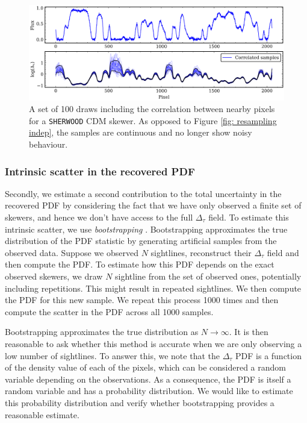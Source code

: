 \begin{figure}
    \centering
    \includegraphics[width=0.85\linewidth]{img/ML/ml_resample_corr.png}
    \caption{A set of 100 draws including the correlation between nearby pixels for a \texttt{SHERWOOD} CDM skewer. As opposed to Figure \ref{fig: resampling indep}, the samples are continuous and no longer show noisy behaviour.}
    \label{fig: resampling corr}
\end{figure}

\subsubsection{Intrinsic scatter in the recovered PDF}
Secondly, we estimate a second contribution to the total uncertainty in the recovered PDF by considering the fact that we have only observed a finite set of skewers, and hence we don't have access to the full $\Delta_\tau$ field. To estimate this intrinsic scatter, we use \emph{bootstrapping} \cite{Kreiss2011}. Bootstrapping approximates the true distribution of the PDF statistic by generating artificial samples from the observed data. Suppose we observed $N$ sightlines, reconstruct their $\Delta_\tau$ field and then compute the PDF. To estimate how this PDF depends on the exact observed skewers, we draw $N$ sightline from the set of observed ones, potentially including repetitions. This might result in repeated sightlines. We then compute the PDF for this new sample. We repeat this process 1000 times and then compute the scatter in the PDF across all 1000 samples. 

Bootstrapping approximates the true distribution as $N\to \infty$. It is then reasonable to ask whether this method is accurate when we are only observing a low number of sightlines. To answer this, we note that the $\Delta_\tau$ PDF is a function of the density value of each of the pixels, which can be considered a random variable depending on the observations. As a consequence, the PDF is itself a random variable and has a probability distribution. We would like to estimate this probability distribution and verify whether bootstrapping provides a reasonable estimate.

